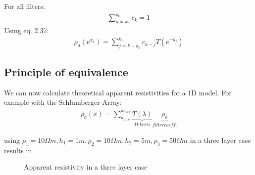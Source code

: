 For all filters:
\begin{align*}
\sum_{k=k_n}^{k_0}c_k=1
\end{align*}
Using eq. 2.37:
\begin{align*}
\rho_a(e^{x_k})=\sum_{j=k-k_0}^{k_n}c_{k-j}T(e^{-y_j})
\end{align*}

\subsection{Principle of equivalence}

We can now calculate theoretical apparent resistivities for a 1D model. For example with the Schlumberger-Array:
\begin{align*}
\rho_a(x)=\sum_{k_{min}}^{k_{max}}\underbrace{T(\lambda)}_{Pekeris}\underbrace{\rho_k}_{filter coeff.}
\end{align*}

using $\rho_1=10\Omega m, h_1=1m, \rho_2=10\Omega m, h_2=5m, \rho_3=50\Omega m$ in a three layer case results in

\begin{figure}[h!]
\begin{center}

\caption{Apparent resistivity in a three layer case}
\label{fig:3lcaseappres}
\end{center}
\end{figure}

